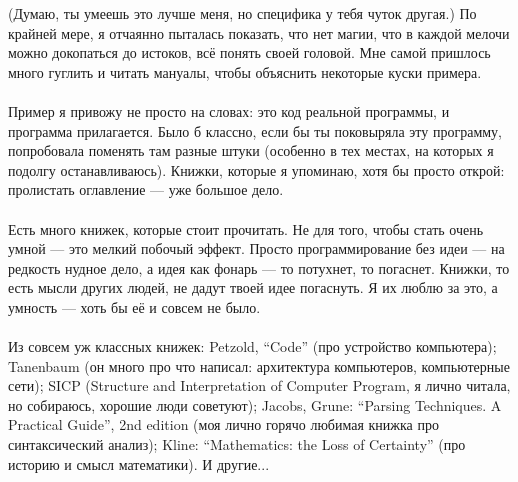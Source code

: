 \documentclass[11pt]{book}
\begin{document}
(Думаю, ты умеешь это лучше меня, но специфика у тебя чуток другая.)
По крайней мере, я отчаянно пыталась показать, что нет магии, что в каждой мелочи можно докопаться до истоков, всё понять своей головой.
Мне самой пришлось много гуглить и читать мануалы, чтобы объяснить некоторые куски примера.
\\ \\
Пример я привожу не просто на словах: это код реальной программы, и программа прилагается.
Было б классно, если бы ты поковыряла эту программу, попробовала поменять там разные штуки
(особенно в тех местах, на которых я подолгу останавливаюсь).
Книжки, которые я упоминаю, хотя бы просто открой: пролистать оглавление --- уже большое дело.
\\ \\
Есть много книжек, которые стоит прочитать.
Не для того, чтобы стать очень умной --- это мелкий побочый эффект.
Просто программирование без идеи --- на редкость нудное дело, а идея как фонарь --- то потухнет, то погаснет.
Книжки, то есть мысли других людей, не дадут твоей идее погаснуть.
Я их люблю за это, а умность --- хоть бы её и совсем не было.
\\ \\
Из совсем уж классных книжек:
Petzold, ``Code'' (про устройство компьютера);
Tanenbaum (он много про что написал: архитектура компьютеров, компьютерные сети);
SICP (Structure and Interpretation of Computer Program, я лично читала, но собираюсь, хорошие люди советуют);
Jacobs, Grune: ``Parsing Techniques. A Practical Guide'', 2nd edition (моя лично горячо любимая книжка про синтаксический анализ);
Kline: ``Mathematics: the Loss of Certainty'' (про историю и смысл математики).
И другие...

\tableofcontents
\end{document}
